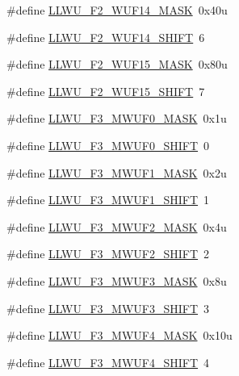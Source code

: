 \begin{DoxyCompactItemize}
\#define \hyperlink{group___l_l_w_u___register___masks_ga5f6f604b22d249edf1101cd9aa087072}{L\+L\+W\+U\+\_\+\+F2\+\_\+\+W\+U\+F14\+\_\+\+M\+A\+SK}~0x40u
\item 
\#define \hyperlink{group___l_l_w_u___register___masks_ga775751b74c858d4adf406ff063630bbf}{L\+L\+W\+U\+\_\+\+F2\+\_\+\+W\+U\+F14\+\_\+\+S\+H\+I\+FT}~6
\item 
\#define \hyperlink{group___l_l_w_u___register___masks_gaa56b2f78b177bd14e66b3863dbb14625}{L\+L\+W\+U\+\_\+\+F2\+\_\+\+W\+U\+F15\+\_\+\+M\+A\+SK}~0x80u
\item 
\#define \hyperlink{group___l_l_w_u___register___masks_gaae1c32b7e20bbc817c4c5af4479e2a91}{L\+L\+W\+U\+\_\+\+F2\+\_\+\+W\+U\+F15\+\_\+\+S\+H\+I\+FT}~7
\item 
\#define \hyperlink{group___l_l_w_u___register___masks_ga1bb6bf136de15f4cc67eee67d53361a9}{L\+L\+W\+U\+\_\+\+F3\+\_\+\+M\+W\+U\+F0\+\_\+\+M\+A\+SK}~0x1u
\item 
\#define \hyperlink{group___l_l_w_u___register___masks_ga3b2c7982efa30073491d05e0dbc698e8}{L\+L\+W\+U\+\_\+\+F3\+\_\+\+M\+W\+U\+F0\+\_\+\+S\+H\+I\+FT}~0
\item 
\#define \hyperlink{group___l_l_w_u___register___masks_gafe847acbd5a46291dd05b8ab682efffe}{L\+L\+W\+U\+\_\+\+F3\+\_\+\+M\+W\+U\+F1\+\_\+\+M\+A\+SK}~0x2u
\item 
\#define \hyperlink{group___l_l_w_u___register___masks_ga6de4a2380bde727b70758cd1c818c859}{L\+L\+W\+U\+\_\+\+F3\+\_\+\+M\+W\+U\+F1\+\_\+\+S\+H\+I\+FT}~1
\item 
\#define \hyperlink{group___l_l_w_u___register___masks_ga3414123c30550a3dea14d84f931e2a0c}{L\+L\+W\+U\+\_\+\+F3\+\_\+\+M\+W\+U\+F2\+\_\+\+M\+A\+SK}~0x4u
\item 
\#define \hyperlink{group___l_l_w_u___register___masks_gac83dee08de7a4bdce21d454a9cfab059}{L\+L\+W\+U\+\_\+\+F3\+\_\+\+M\+W\+U\+F2\+\_\+\+S\+H\+I\+FT}~2
\item 
\#define \hyperlink{group___l_l_w_u___register___masks_gab85f671f2c6f2112c4e2e14845ef998b}{L\+L\+W\+U\+\_\+\+F3\+\_\+\+M\+W\+U\+F3\+\_\+\+M\+A\+SK}~0x8u
\item 
\#define \hyperlink{group___l_l_w_u___register___masks_ga91a71ba06b95076252cd2594112da05d}{L\+L\+W\+U\+\_\+\+F3\+\_\+\+M\+W\+U\+F3\+\_\+\+S\+H\+I\+FT}~3
\item 
\#define \hyperlink{group___l_l_w_u___register___masks_gabd85c849a3b177444a91aa37457252a8}{L\+L\+W\+U\+\_\+\+F3\+\_\+\+M\+W\+U\+F4\+\_\+\+M\+A\+SK}~0x10u
\item 
\#define \hyperlink{group___l_l_w_u___register___masks_gac1d2eb89a620cf503f11eecf9e8ece1f}{L\+L\+W\+U\+\_\+\+F3\+\_\+\+M\+W\+U\+F4\+\_\+\+S\+H\+I\+FT}~4

\end{DoxyCompactItemize}
